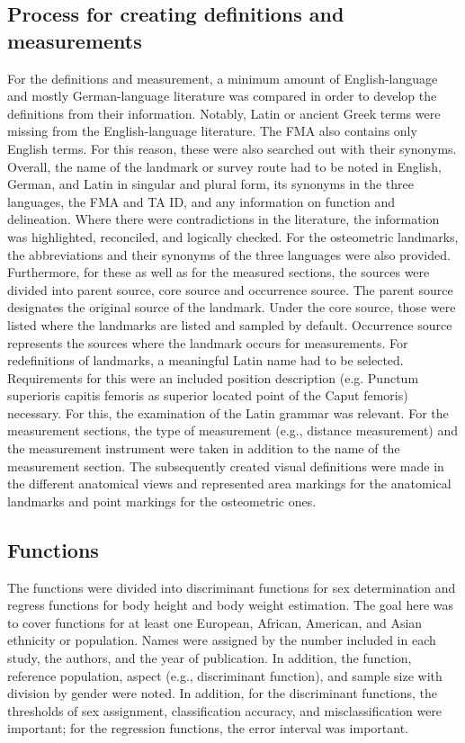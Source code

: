 \documentclass[sw]{iosart2x}
\begin{document}
\subsection{Process for creating definitions and measurements}
For the definitions and measurement, a minimum amount of English-language and mostly German-language literature was compared in order to develop the definitions from their information.
Notably, Latin or ancient Greek terms were missing from the English-language literature.
The FMA also contains only English terms.
For this reason, these were also searched out with their synonyms.
Overall, the name of the landmark or survey route had to be noted in English, German, and Latin in singular and plural form, its synonyms in the three languages, the FMA and TA ID, and any information on function and delineation.
Where there were contradictions in the literature, the information was highlighted, reconciled, and logically checked.
For the osteometric landmarks, the abbreviations and their synonyms of the three languages were also provided.
Furthermore, for these as well as for the measured sections, the sources were divided into parent source, core source and occurrence source.
The parent source designates the original source of the landmark.
Under the core source, those were listed where the landmarks are listed and sampled by default.
Occurrence source represents the sources where the landmark occurs for measurements.
For redefinitions of landmarks, a meaningful Latin name had to be selected.
Requirements for this were an included position description (e.g. Punctum superioris capitis femoris as superior located point of the Caput femoris) necessary.
For this, the examination of the Latin grammar was relevant.
For the measurement sections, the type of measurement (e.g., distance measurement) and the measurement instrument were taken in addition to the name of the measurement section.
The subsequently created visual definitions were made in the different anatomical views and represented area markings for the anatomical landmarks and point markings for the osteometric ones.
\subsection{Functions}
The functions were divided into discriminant functions for sex determination and regress functions for body height and body weight estimation.
The goal here was to cover functions for at least one European, African, American, and Asian ethnicity or population.
Names were assigned by the number included in each study, the authors, and the year of publication.
In addition, the function, reference population, aspect (e.g., discriminant function), and sample size with division by gender were noted.
In addition, for the discriminant functions, the thresholds of sex assignment, classification accuracy, and misclassification were important; for the regression functions, the error interval was important.
\end{document}
